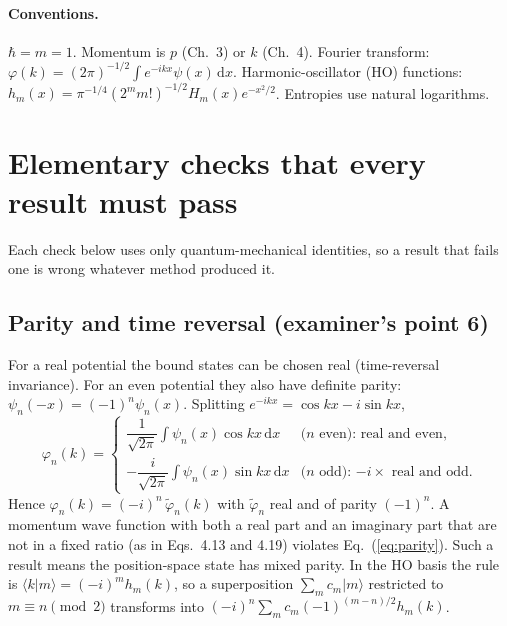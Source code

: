 \documentclass[11pt,a4paper]{article}
\newcommand{\Eq}[1]{Eq.~(#1)}
\newcommand{\ket}[1]{|#1\rangle}
\newcommand{\dd}{\mathrm{d}}
\begin{document}
\paragraph{Conventions.} $\hbar=m=1$. Momentum is $p$ (Ch.~3) or $k$ (Ch.~4). Fourier transform:
$\varphi(k)=(2\pi)^{-1/2}\int e^{-ikx}\psi(x)\,\dd x$. Harmonic-oscillator (HO) functions:
$h_m(x)=\pi^{-1/4}(2^m m!)^{-1/2}H_m(x)e^{-x^2/2}$. Entropies use natural logarithms.

\section{Elementary checks that every result must pass}
\label{sec:checks}

Each check below uses only quantum-mechanical identities, so a result that fails one is
wrong whatever method produced it.

\subsection{Parity and time reversal (examiner's point 6)}
\label{sec:parity}
For a real potential the bound states can be chosen real (time-reversal invariance). For an
even potential they also have definite parity: $\psi_n(-x)=(-1)^n\psi_n(x)$. Splitting
$e^{-ikx}=\cos kx-i\sin kx$,
\begin{equation}
\varphi_n(k)=
\begin{cases}
\dfrac{1}{\sqrt{2\pi}}\displaystyle\int\psi_n(x)\cos kx\,\dd x & \text{($n$ even): real and even,}\\[10pt]
-\dfrac{i}{\sqrt{2\pi}}\displaystyle\int\psi_n(x)\sin kx\,\dd x & \text{($n$ odd): $-i\times$ real and odd.}
\end{cases}
\label{eq:parity}
\end{equation}
Hence $\varphi_n(k)=(-i)^n\,\tilde\varphi_n(k)$ with $\tilde\varphi_n$ real and of parity
$(-1)^n$. A momentum wave function with both a real part and an imaginary part that are not
in a fixed ratio (as in Eqs.~4.13 and 4.19) violates \Eq{\ref{eq:parity}}. Such a result means
the position-space state has mixed parity. In the HO basis the rule is
$\langle k|m\rangle=(-i)^m h_m(k)$, so a superposition $\sum_m c_m\ket m$ restricted to
$m\equiv n \pmod 2$ transforms into $(-i)^n\sum_m c_m(-1)^{(m-n)/2}h_m(k)$.
\end{document}
